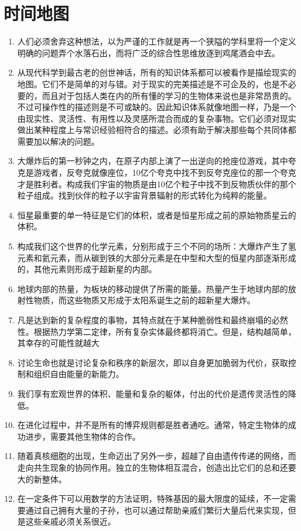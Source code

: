 \documentclass[UTF8]{ctexart}
\begin{document}
	\section{时间地图}
		\begin{enumerate}
			\item 人们必须舍弃这种想法，以为严谨的工作就是再一个狭隘的学科里将一个定义明确的问题弄个水落石出，而将广泛的综合性思维放逐到鸡尾酒会中去。
			\item 从现代科学到最古老的创世神话，所有的知识体系都可以被看作是描绘现实的地图。它们不是简单的对与错。对于现实的完美描述是不可企及的，也是不必要的，而且对于包括人类在内的所有懂的学习的生物体来说也是非常昂贵的。不过可操作性的描述则是不可或缺的。因此知识体系就像地图一样，乃是一个由现实性、灵活性、有用性以及灵感所混合而成的复杂事物。它们必须对现实做出某种程度上与常识经验相符合的描述。必须有助于解决那些每个共同体都需要加以解决的问题。
			\item 大爆炸后的第一秒钟之内，在原子内部上演了一出逆向的抢座位游戏，其中夸克是游戏者，反夸克就像座位，10亿个夸克中找不到反夸克座位的那一个夸克才是胜利者。构成我们宇宙的物质是由10亿个粒子中找不到反物质伙伴的那个粒子组成。找到伙伴的粒子以宇宙背景辐射的形式转化为纯粹的能量。
			\item 恒星最重要的单一特征是它们的体积，或者是恒星形成之前的原始物质星云的体积。
			\item 构成我们这个世界的化学元素，分别形成于三个不同的场所：大爆炸产生了氢元素和氦元素，而从碳到铁的大部分元素是在中型和大型的恒星内部逐渐形成的，其他元素则形成于超新星的内部。
			\item 地球内部的热量，为板块的移动提供了所需的能量。热量产生于地球内部的放射性物质，而这些物质又形成于太阳系诞生之前的超新星大爆炸。
			\item 凡是达到新的复杂程度的事物，其特点就在于某种脆弱性和最终崩塌的必然性。根据热力学第二定律，所有复杂实体最终都将消亡。但是，结构越简单，其幸存的可能性就越大
			\item 讨论生命也就是讨论复杂和秩序的新层次，即以自身更加脆弱为代价，获取控制和组织自由能量的新能力。
			\item 我们享有宏观世界的体积、能量和复杂的躯体，付出的代价是遗传灵活性的降低。
			\item 在进化过程中，并不是所有的博弈规则都是胜者通吃。通常，特定生物体的成功进步，需要其他生物体的合作。
			\item 随着真核细胞的出现，生命迈出了另外一步，超越了自由遗传传递的网络，而走向共生现象的协同作用。独立的生物体相互混合，创造出比它们的总和还要大的新整体。
			\item 在一定条件下可以用数学的方法证明，特殊基因的最大限度的延续，不一定需要通过自己拥有大量的子孙，也可以通过帮助亲戚们繁衍大量后代来实现，但是这些亲戚必须关系很近。
			

\end{enumerate}
\end{document}

